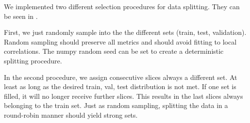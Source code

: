 We implemented two different selection procedures for data splitting. They can be seen in .

First, we just randomly sample into the the different sets (train, test, validation). Random sampling should preserve all metrics and should avoid fitting to local correlations. The numpy random seed can be set to create a deterministic splitting procedure.

In the second procedure, we assign consecutive slices always a different set. At least as long as the desired train, val, test distribution is not met. If one set is filled, it will no longer receive further slices. This results in the last slices always belonging to the train set. Just as random sampling, splitting the data in a round-robin manner should yield strong sets.
